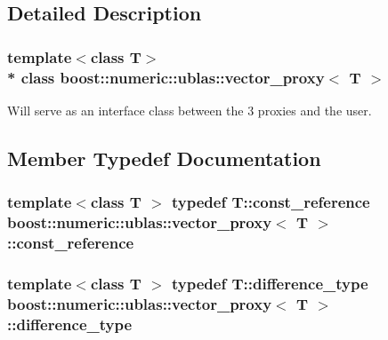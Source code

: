 \subsection{Detailed Description}
\subsubsection*{template$<$class T$>$\\*
class boost\+::numeric\+::ublas\+::vector\+\_\+proxy$<$ T $>$}

Will serve as an interface class between the 3 proxies and the user. 

\subsection{Member Typedef Documentation}
\subsubsection[{\texorpdfstring{const\+\_\+reference}{const_reference}}]{\setlength{\rightskip}{0pt plus 5cm}template$<$class T $>$ typedef T\+::const\+\_\+reference {\bf boost\+::numeric\+::ublas\+::vector\+\_\+proxy}$<$ T $>$\+::{\bf const\+\_\+reference}}\hypertarget{classboost_1_1numeric_1_1ublas_1_1vector__proxy_ae5b208fd787cd64034fae0d362198e76}{}\label{classboost_1_1numeric_1_1ublas_1_1vector__proxy_ae5b208fd787cd64034fae0d362198e76}
\subsubsection[{\texorpdfstring{difference\+\_\+type}{difference_type}}]{\setlength{\rightskip}{0pt plus 5cm}template$<$class T $>$ typedef T\+::difference\+\_\+type {\bf boost\+::numeric\+::ublas\+::vector\+\_\+proxy}$<$ T $>$\+::{\bf difference\+\_\+type}}\hypertarget{classboost_1_1numeric_1_1ublas_1_1vector__proxy_ad030a4a516d8b6eb2d467af2a6fe8ec5}{}\label{classboost_1_1numeric_1_1ublas_1_1vector__proxy_ad030a4a516d8b6eb2d467af2a6fe8ec5}
